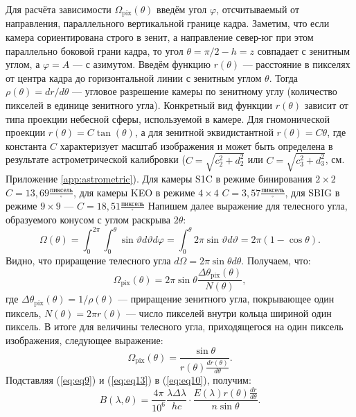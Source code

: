 \documentclass[12pt,a4paper]{article}
\begin{document}
Для расчёта зависимости $\Omega_{\text{pix}}(\theta)$ введём угол $\varphi$, отсчитываемый от направления, параллельного вертикальной границе кадра. Заметим, что если камера сориентирована строго в зенит, а направление север-юг при этом параллельно боковой грани кадра, то угол $\theta=\pi / 2 - h = z$ совпадает с зенитным углом, а $\varphi = A$ --- с азимутом. Введём функцию $r(\theta)$ --- расстояние в пикселях от центра кадра до горизонтальной линии с зенитным углом $\theta$. Тогда $\rho(\theta)=dr/d\theta$ --- угловое разрешение камеры по зенитному углу (количество пикселей в единице зенитного угла). Конкретный вид функции $r(\theta)$ зависит от типа проекции небесной сферы, используемой в камере. Для гномонической проекции $r(\theta)=C \tan (\theta)$, а для зенитной эквидистантной $r(\theta)=C\theta$, где константа $C$ характеризует масштаб изображения и может быть определена в результате астрометрической калибровки ($C=\sqrt{c_2^2+d_2^2}$ или $C=\sqrt{c_3^2+d_3^2}$, см. Приложение \ref{app:astrometric}). Для камеры S1C в режиме бинирования $2\times2$ $C=13,69 \frac{\text{пиксель}}{^{\circ}}$, для камеры KEO в режиме $4\times4$ $C= 3,57 \frac{\text{пиксель}}{^{\circ}}$, для SBIG в режиме $9\times9$ --- $C=18,51 \frac{\text{пиксель}}{^{\circ}}$   Напишем далее выражение для телесного угла, образуемого конусом с углом раскрыва $2\theta$:
\begin{equation}\label{eq:eq11}
\Omega (\theta)= \int_{0}^{2\pi} \int_{0}^{\theta} \sin\vartheta d\vartheta d\varphi = \int_{0}^{\theta} 2\pi\sin{\vartheta} d\vartheta=2\pi(1-\cos\theta).
\end{equation}
Видно, что приращение телесного угла $d\Omega = 2\pi\sin{\theta}d\theta$. Получаем, что:  
\begin{equation}\label{eq:eq12}
\Omega_\text{pix} (\theta)= 2\pi\sin{\theta} \frac{\Delta\theta_\text{pix}(\theta)}{N(\theta)},
\end{equation}
где $\Delta\theta_\text{pix}(\theta)=1/\rho(\theta)$ --- приращение зенитного угла, покрывающее один пиксель, $N(\theta) = 2\pi r(\theta)$ --- число пикселей внутри кольца шириной один пиксель. В итоге для величины телесного угла, приходящегося на один пиксель изображения, следующее выражение:
\begin{equation}\label{eq:eq13}
\Omega_\text{pix} (\theta)= \frac{\sin{\theta}}{r(\theta) \frac{dr(\theta)}{d\theta}}.
\end{equation}
Подставляя (\ref{eq:eq9}) и (\ref{eq:eq13}) в (\ref{eq:eq10}), получим:
\begin{equation}\label{eq:eq14}
B(\lambda,\theta) = \frac {4\pi}{10^6} \frac{\lambda\Delta\lambda}{hc}\cdot \frac{E(\lambda) r(\theta)\frac{dr}{d\theta}} {n \sin\theta}.
\end{equation}
\end{document}

